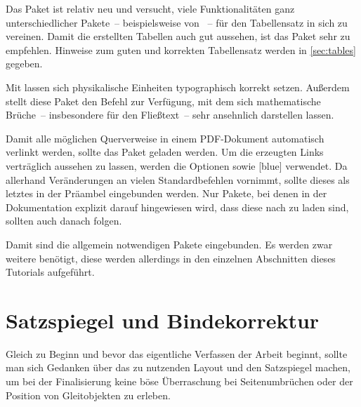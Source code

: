 \documentclass[%
  english,ngerman,%
  geometry=no,DIV=12,automark,%
]{tudscrartcl}
\begin{document}
%
\begin{Excerpt*}
\usepackage{enumitem}
\end{Excerpt*}
%
Das Paket  ist relativ neu und versucht, viele Funktionalitäten 
ganz unterschiedlicher Pakete~-- beispielsweise von ~-- für 
den Tabellensatz in sich zu vereinen. Damit die erstellten Tabellen auch gut 
aussehen, ist das Paket  sehr zu empfehlen. Hinweise zum 
guten und korrekten Tabellensatz werden in \autoref{sec:tables} gegeben.
%
\begin{Excerpt*}
\usepackage{booktabs}
\end{Excerpt*}
\begin{Excerpt*}
\usepackage{array}
\end{Excerpt*}
\begin{Excerpt*}
\usepackage{tabu}
\usepackage{tabularx}
\end{Excerpt*}
%
Mit  lassen sich physikalische Einheiten typographisch korrekt 
setzen. Außerdem stellt diese Paket den Befehl  zur Verfügung, 
mit dem sich mathematische Brüche~-- insbesondere für den Fließtext~-- sehr 
ansehnlich darstellen lassen.
%
\begin{Excerpt*}
\usepackage{units}
\end{Excerpt*}
%
Damit alle möglichen Querverweise in einem PDF-Dokument automatisch verlinkt 
werden, sollte das Paket  geladen werden. Um die erzeugten 
Links verträglich aussehen zu lassen, werden die Optionen  
sowie [blue] verwendet. Da  allerhand 
Veränderungen an vielen Standardbefehlen vornimmt, sollte dieses als letztes in 
der Präambel eingebunden werden. Nur Pakete, bei denen in der Dokumentation 
explizit darauf hingewiesen wird, dass diese nach  zu laden 
sind, sollten auch danach folgen.
%
\begin{Excerpt*}
\usepackage[colorlinks,linkcolor=blue]{hyperref}
\end{Excerpt*}
%
Damit sind die allgemein notwendigen Pakete eingebunden. Es werden zwar weitere 
benötigt, diese werden allerdings in den einzelnen Abschnitten dieses Tutorials 
aufgeführt.
\begin{Excerpt*}
\begin{document}
\end{Excerpt*}



\section{Satzspiegel und Bindekorrektur}
Gleich zu Beginn und bevor das eigentliche Verfassen der Arbeit beginnt, sollte 
man sich Gedanken über das zu nutzenden Layout und den Satzspiegel machen, um 
bei der Finalisierung keine böse Überraschung bei Seitenumbrüchen oder der 
Position von Gleitobjekten zu erleben.
\end{document}
